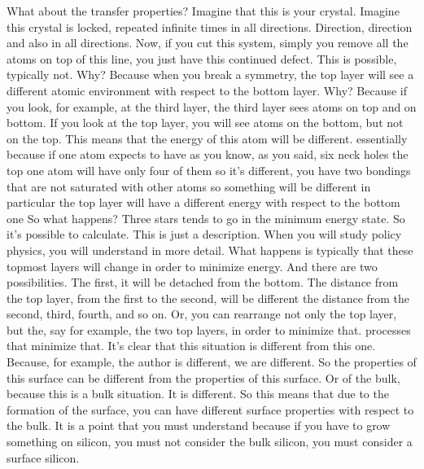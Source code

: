 What about the transfer properties? Imagine that this is your crystal. Imagine this crystal is locked, repeated infinite times in all directions. Direction, direction and also in all directions. Now, if you cut this system, simply you remove all the atoms on top of this line, you just have this continued defect. This is possible, typically not. Why? Because when you break a symmetry, the top layer will see a different atomic environment with respect to the bottom layer. Why? Because if you look, for example, at the third layer, the third layer sees atoms on top and on bottom. If you look at the top layer, you will see atoms on the bottom, but not on the top. This means that the energy of this atom will be different. essentially because if one atom expects to have as you know, as you said, six neck holes the top one atom will have only four of them so it's different, you have two bondings that are not saturated with other atoms so something will be different in particular the top layer will have a different energy with respect to the bottom one So what happens? Three stars tends to go in the minimum energy state. So it's possible to calculate. This is just a description. When you will study policy physics, you will understand in more detail. What happens is typically that these topmost layers will change in order to minimize energy. And there are two possibilities. The first, it will be detached from the bottom. The distance from the top layer, from the first to the second, will be different the distance from the second, third, fourth, and so on. Or, you can rearrange not only the top layer, but the, say for example, the two top layers, in order to minimize that. processes that minimize that. It's clear that this situation is different from this one. Because, for example, the author is different, we are different. So the properties of this surface can be different from the properties of this surface. Or of the bulk, because this is a bulk situation. It is different. So this means that due to the formation of the surface, you can have different surface properties with respect to the bulk. It is a point that you must understand because if you have to grow something on silicon, you must not consider the bulk silicon, you must consider a surface silicon.
